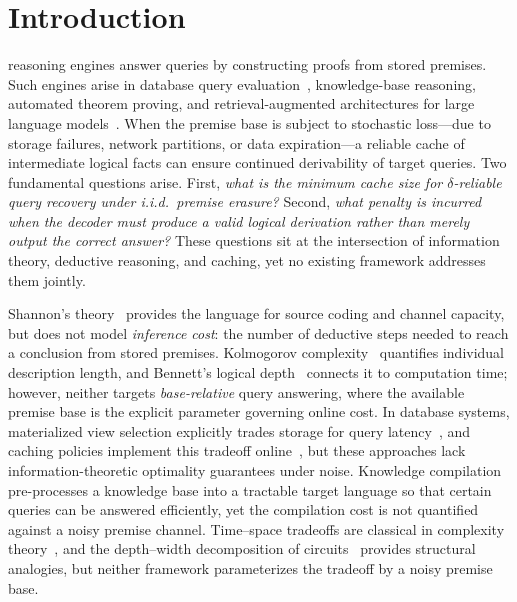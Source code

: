 \documentclass[journal]{IEEEtran}
\numberwithin{equation}{section}
\begin{document}
\section{Introduction}
\label{sec:introduction}

 reasoning engines answer queries by constructing
proofs from stored premises.
Such engines arise in database query
evaluation~\cite{abiteboul1995foundations}, knowledge-base reasoning, automated
theorem proving, and retrieval-augmented architectures for large language
models~\cite{lewis2020retrieval,brown2020language}.
When the premise base is subject to stochastic loss---due to storage failures,
network partitions, or data expiration---a reliable cache of intermediate logical
facts can ensure continued derivability of target queries.
Two fundamental questions arise.
First, \emph{what is the minimum cache size for $\delta$-reliable query recovery
under i.i.d.\ premise erasure?}
Second, \emph{what penalty is incurred when the decoder must produce a valid
logical derivation rather than merely output the correct answer?}
These questions sit at the intersection of information theory, deductive reasoning,
and caching, yet no existing framework addresses them jointly.

Shannon's theory~\cite{shannon1948mathematical,cover2006elements} provides the
language for source coding and channel capacity, but does not model
\emph{inference cost}: the number of deductive steps needed to reach a conclusion
from stored premises.
Kolmogorov complexity~\cite{kolmogorov1965three,li2008introduction} quantifies
individual description length, and Bennett's logical
depth~\cite{bennett1988logical} connects it to computation time; however, neither
targets \emph{base-relative} query answering, where the available premise base is
the explicit parameter governing online cost.
In database systems, materialized view selection explicitly trades storage for
query latency~\cite{chaudhuri1995optimizing,gupta1997materialized,harinarayan1996implementing},
and caching policies implement this tradeoff
online~\cite{sleator1985amortized,belady1966study,megiddo2003arc}, but these
approaches lack information-theoretic optimality guarantees under noise.
Knowledge compilation~\cite{darwiche2002knowledge} pre-processes a knowledge base
into a tractable target language so that certain queries can be answered
efficiently, yet the compilation cost is not quantified against a noisy premise
channel.
Time--space tradeoffs are classical in complexity
theory~\cite{yao1985should,borodin2023time}, and the depth--width decomposition of
circuits~\cite{wegener1987complexity,vollmer1999introduction} provides structural
analogies, but neither framework parameterizes the tradeoff by a noisy premise
base.
\end{document}
